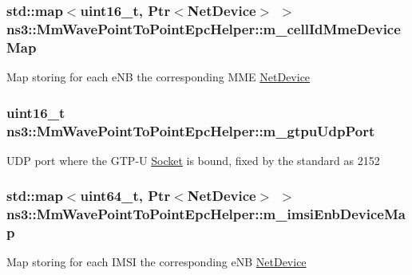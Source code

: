 \subsubsection[{\texorpdfstring{m\+\_\+cell\+Id\+Mme\+Device\+Map}{m_cellIdMmeDeviceMap}}]{\setlength{\rightskip}{0pt plus 5cm}std\+::map$<$uint16\+\_\+t, {\bf Ptr}$<${\bf Net\+Device}$>$ $>$ ns3\+::\+Mm\+Wave\+Point\+To\+Point\+Epc\+Helper\+::m\+\_\+cell\+Id\+Mme\+Device\+Map\hspace{0.3cm}{\ttfamily [private]}}\hypertarget{classns3_1_1MmWavePointToPointEpcHelper_a0c48b7221642d1cf7f76a66bd4b3164c}{}\label{classns3_1_1MmWavePointToPointEpcHelper_a0c48b7221642d1cf7f76a66bd4b3164c}
Map storing for each e\+NB the corresponding M\+ME \hyperlink{classns3_1_1NetDevice}{Net\+Device} 
\subsubsection[{\texorpdfstring{m\+\_\+gtpu\+Udp\+Port}{m_gtpuUdpPort}}]{\setlength{\rightskip}{0pt plus 5cm}uint16\+\_\+t ns3\+::\+Mm\+Wave\+Point\+To\+Point\+Epc\+Helper\+::m\+\_\+gtpu\+Udp\+Port\hspace{0.3cm}{\ttfamily [private]}}\hypertarget{classns3_1_1MmWavePointToPointEpcHelper_af751b4022bf80a9ea76f18805534a9d0}{}\label{classns3_1_1MmWavePointToPointEpcHelper_af751b4022bf80a9ea76f18805534a9d0}
U\+DP port where the G\+T\+P-\/U \hyperlink{classns3_1_1Socket}{Socket} is bound, fixed by the standard as 2152 
\subsubsection[{\texorpdfstring{m\+\_\+imsi\+Enb\+Device\+Map}{m_imsiEnbDeviceMap}}]{\setlength{\rightskip}{0pt plus 5cm}std\+::map$<$uint64\+\_\+t, {\bf Ptr}$<${\bf Net\+Device}$>$ $>$ ns3\+::\+Mm\+Wave\+Point\+To\+Point\+Epc\+Helper\+::m\+\_\+imsi\+Enb\+Device\+Map\hspace{0.3cm}{\ttfamily [private]}}\hypertarget{classns3_1_1MmWavePointToPointEpcHelper_a36c8083a300827d6abf1ae6658f380c6}{}\label{classns3_1_1MmWavePointToPointEpcHelper_a36c8083a300827d6abf1ae6658f380c6}
Map storing for each I\+M\+SI the corresponding e\+NB \hyperlink{classns3_1_1NetDevice}{Net\+Device} 
